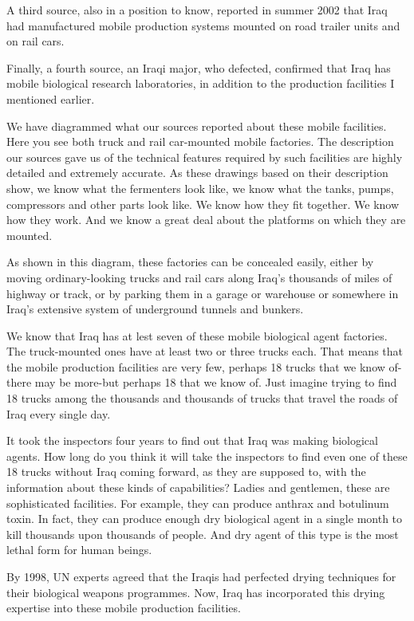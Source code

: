 \documentclass[10pt,a4paper]{article}
\begin{document}
A third source, also in a position to know, reported in summer 2002 that Iraq had manufactured mobile production systems mounted on road trailer units and on rail cars.

Finally, a fourth source, an Iraqi major, who defected, confirmed that Iraq has mobile biological research laboratories, in addition to the production facilities I mentioned earlier.

We have diagrammed what our sources reported about these mobile facilities. Here you see both truck and rail car-mounted mobile factories. The description our sources gave us of the technical features required by such facilities are highly detailed and extremely accurate. As these drawings based on their description show, we know what the fermenters look like, we know what the tanks, pumps, compressors and other parts look like. We know how they fit together. We know how they work. And we know a great deal about the platforms on which they are mounted.

As shown in this diagram, these factories can be concealed easily, either by moving ordinary-looking trucks and rail cars along Iraq's thousands of miles of highway or track, or by parking them in a garage or warehouse or somewhere in Iraq's extensive system of underground tunnels and bunkers.

We know that Iraq has at lest seven of these mobile biological agent factories. The truck-mounted ones have at least two or three trucks each. That means that the mobile production facilities are very few, perhaps 18 trucks that we know of-there may be more-but perhaps 18 that we know of. Just imagine trying to find 18 trucks among the thousands and thousands of trucks that travel the roads of Iraq every single day.

It took the inspectors four years to find out that Iraq was making biological agents. How long do you think it will take the inspectors to find even one of these 18 trucks without Iraq coming forward, as they are supposed to, with the information about these kinds of capabilities? Ladies and gentlemen, these are sophisticated facilities. For example, they can produce anthrax and botulinum toxin. In fact, they can produce enough dry biological agent in a single month to kill thousands upon thousands of people. And dry agent of this type is the most lethal form for human beings.

By 1998, UN experts agreed that the Iraqis had perfected drying techniques for their biological weapons programmes. Now, Iraq has incorporated this drying expertise into these mobile production facilities.
\end{document}
